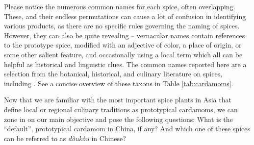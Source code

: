 \documentclass[12pt]{article}
\begin{document}
Please notice the numerous common names for each spice, often overlapping. These, and their endless permutations can cause a lot of confusion in identifying various products, as there are no specific rules governing the naming of spices. However, they can also be quite revealing -- vernacular names contain references to the prototype spice, modified with an adjective of color, a place of origin, or some other salient feature, and occasionally using a local term which all can be helpful as historical and linguistic clues. The common names reported here are a selection from the botanical, historical, and culinary literature on spices, including \textcites{vanwyk_2014_culinary,hill_2004_contemporary,dalby_2000_dangerous,hu_2005_food,burkill_1966_dictionary,anderson_2023_history}. See a concise overview of these taxons in Table \ref{tab:cardamoms}.

Now that we are familiar with the most important spice plants in Asia that define local or regional culinary traditions as prototypical cardamoms, we can zone in on our main objective and pose the following questions: What is the ``default'', prototypical cardamom in China, if any? And which one of these spices can be referred to as \textit{dòukòu} in Chinese?



\end{document}
